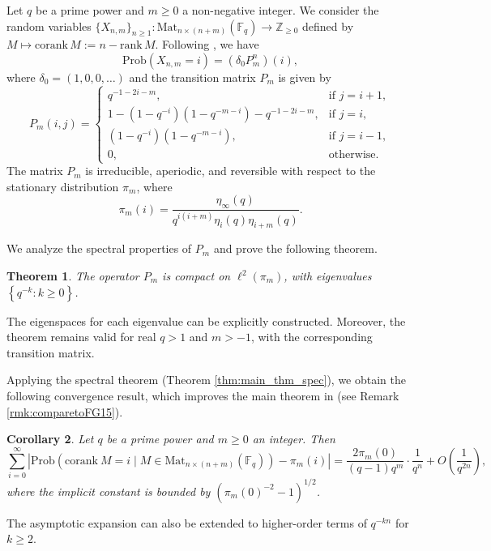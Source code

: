 \documentclass[a4]{amsart}
\newcommand{\Prob}{{\mathrm{Prob}}}
\newcommand{\corank}{\mathrm{corank~}}
\newtheorem{theorem}{Theorem}
\newtheorem{corollary}[theorem]{Corollary}
\theoremstyle{remark} \newtheorem{remark}[theorem]{Remark}
\begin{document}
\medskip
Let $q$ be a prime power and $m \geq 0$ a non-negative integer. 
We consider the random variables $\{X_{n,m}\}_{n \geq 1} : \text{Mat}_{n \times (n+m)}(\mathbb{F}_q) \to \mathbb{Z}_{\geq 0}$ defined by $M \mapsto \text{corank}\, M := n - \text{rank}\, M$. Following \cite{gerthiii1986Limit}, we have  
$$
\Prob\left(X_{n,m} = i\right) = (\delta_0 P_m^n)(i),
$$
where $\delta_0 = (1, 0, 0, \dots)$ and the transition matrix $P_m$ is given by  
$$
P_m(i,j) = 
\begin{cases}
q^{-1-2i-m}, & \text{if } j = i+1, \\
1 - (1 - q^{-i})(1 - q^{-m-i}) - q^{-1-2i-m}, & \text{if } j = i, \\
(1 - q^{-i})(1 - q^{-m-i}), & \text{if } j = i-1, \\
0, & \text{otherwise.}
\end{cases}
$$  
The matrix $P_m$ is irreducible, aperiodic, and reversible with respect to the stationary distribution $\pi_m$, where  
$$
\pi_m(i) = \frac{\eta_\infty(q)}{q^{i(i+m)} \eta_i(q) \eta_{i+m}(q)}.
$$  

We analyze the spectral properties of $P_m$ and prove the following theorem.  

\begin{theorem}\label{thm:main_thm_uniform}  
The operator $P_m$ is compact on $\ell^2(\pi_m)$, with eigenvalues $\left\{ q^{-k} : k \geq 0 \right\}$.  
\end{theorem}  

The eigenspaces for each eigenvalue can be explicitly constructed. Moreover, the theorem remains valid for real $q > 1$ and $m > -1$, with the corresponding transition matrix.  

Applying the spectral theorem (Theorem \ref{thm:main_thm_spec}), we obtain the following convergence result, which improves the main theorem in \cite{fulman2015Steins} (see Remark \ref{rmk:comparetoFG15}).  

\begin{corollary}\label{cor:uniform}  
Let $q$ be a prime power and $m \geq 0$ an integer. Then  
$$
\sum_{i=0}^\infty \left| \Prob\left(\corank M = i \mid M \in \text{Mat}_{n \times (n+m)}(\mathbb{F}_q)\right) - \pi_m(i) \right| = \frac{2\pi_m(0)}{(q-1)q^m} \cdot \frac{1}{q^n} + O\left(\frac{1}{q^{2n}}\right),
$$  
where the implicit constant is bounded by $(\pi_m(0)^{-2} - 1)^{1/2}$.  
\end{corollary}  
The asymptotic expansion can also be extended to higher-order terms of $q^{-kn}$ for $k \geq 2$.  
\end{document}

